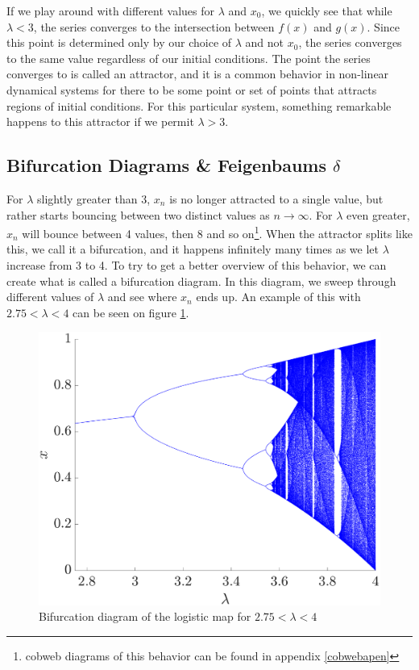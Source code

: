 \documentclass[12pt,oneside,a4paper]{article}
\numberwithin{equation}{section}
\begin{document}
{{{{If we play around with different values for $\lambda$ and 
$x_0$, we quickly see that while $\lambda<3$, the series converges to the 
intersection between $f(x)$ and $g(x)$. Since this point is determined only by our choice of $\lambda$ 
and not $x_0$, the series converges to the same value regardless of our initial conditions. The point
the series converges to is called an attractor, and it is a common behavior in non-linear dynamical
systems for there to be some point or set of points that attracts regions of initial conditions. For this particular system, something remarkable happens to this attractor if we permit $\lambda>3$.

\subsection{Bifurcation Diagrams \& Feigenbaums $\delta$}
For $\lambda$ slightly greater than 3, $x_n$ is no longer attracted to a single 
value, but rather starts bouncing between two distinct values as $n \rightarrow 
\infty$. For $\lambda$ even greater, $x_n$ will bounce between 4 values, then 8 
and so on\footnote{cobweb diagrams of this behavior can be found in appendix 
\ref{cobwebapen}}. When the attractor splits like this, we call it a 
bifurcation, and it happens infinitely many times as we let $\lambda$ increase 
from 3 to 4. To try to get a better overview of this behavior, we can create 
what is called a bifurcation diagram. In this diagram, we sweep through 
different values of $\lambda$ and see where $x_n$ ends up. An example of this 
with $2.75<\lambda<4$ can be seen on figure \ref{bifurcation}.
\begin{figure}
	\centering
	\includegraphics[width=0.65\linewidth]{Figures/Bifurcation}
	\caption{Bifurcation diagram of the logistic map for $2.75<\lambda<4$}
	\label{bifurcation}
\end{figure}
}}}}
\end{document}
